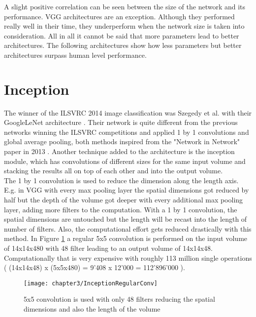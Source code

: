 A slight positive correlation can be seen between the size of the network and its performance. VGG architectures are an exception. Although they performed really well in their time, they underperform when the network size is taken into consideration. All in all it cannot be said that more parameters  lead to better architectures. The following architectures show how less parameters but better architectures surpass human level performance.

\section{Inception}

The winner of the ILSVRC 2014 image classification was Szegedy et al. with their GoogleLeNet architecture \cite{szegedy2015going}. Their network is quite different from the previous networks winning the ILSVRC competitions and applied 1 by 1 convolutions and global average pooling, both methods inspired from the "Network in Network" paper in 2013 \cite{lin2013network}. Another technique added to the architecture is the inception module, which has convolutions of different sizes for the same input volume and stacking the results all on top of each other and into the output volume. \\

The 1 by 1 convolution is used to reduce the dimension along the length axis. E.g. in VGG with every max pooling layer the spatial dimensions got reduced by half but the depth of the volume got deeper with every additional max pooling layer, adding more filters to the computation. With a 1 by 1 convolution, the spatial dimensions are untouched but the length will be recast into the length of number of filters. Also, the computational effort gets reduced drastically with this method. In Figure \ref{fig:InceptionRegularConv} a regular 5x5 convolution is performed on the input volume of 14x14x480 with 48 filter leading to an output volume of 14x14x48. Computationally that is very expensive with roughly 113 million single operations ( (14x14x48) x (5x5x480) = 9'408 x 12'000 = 112'896'000 ).

\begin{figure}[H]
  \centering
  \caption{5x5 convolution is used with only 48 filters reducing the spatial dimensions and also the length of the volume \cite{ReviewGoogleLeNetv1}}
  \texttt{[image: chapter3/InceptionRegularConv]}
  \label{fig:InceptionRegularConv}
\end{figure}

